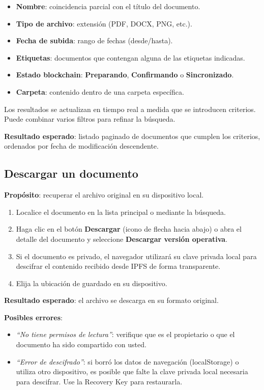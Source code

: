\documentclass[11pt, a4paper]{article}
\begin{document}
\begin{itemize}
    \item \textbf{Nombre}: coincidencia parcial con el t\'{i}tulo del documento.
    \item \textbf{Tipo de archivo}: extensi\'{o}n (PDF, DOCX, PNG, etc.).
    \item \textbf{Fecha de subida}: rango de fechas (desde/hasta).
    \item \textbf{Etiquetas}: documentos que contengan alguna de las etiquetas indicadas.
    \item \textbf{Estado blockchain}: \textbf{Preparando}, \textbf{Confirmando} o \textbf{Sincronizado}.
    \item \textbf{Carpeta}: contenido dentro de una carpeta espec\'{i}fica.
\end{itemize}

Los resultados se actualizan en tiempo real a medida que se introducen criterios. Puede combinar varios filtros para refinar la b\'{u}squeda.

\textbf{Resultado esperado}: listado paginado de documentos que cumplen los criterios, ordenados por fecha de modificaci\'{o}n descendente.

\subsection{Descargar un documento}

\textbf{Prop\'{o}sito}: recuperar el archivo original en su dispositivo local.

\begin{enumerate}
    \item Localice el documento en la lista principal o mediante la b\'{u}squeda.
    \item Haga clic en el bot\'{o}n \textbf{Descargar} (icono de flecha hacia abajo) o abra el detalle del documento y seleccione \textbf{Descargar versi\'{o}n operativa}.
    \item Si el documento es privado, el navegador utilizar\'{a} su clave privada local para descifrar el contenido recibido desde IPFS de forma transparente.
    \item Elija la ubicaci\'{o}n de guardado en su dispositivo.
\end{enumerate}

\textbf{Resultado esperado}: el archivo se descarga en su formato original.

\textbf{Posibles errores}:
\begin{itemize}
    \item \textit{``No tiene permisos de lectura''}: verifique que es el propietario o que el documento ha sido compartido con usted.
    \item \textit{``Error de descifrado''}: si borr\'{o} los datos de navegaci\'{o}n (localStorage) o utiliza otro dispositivo, es posible que falte la clave privada local necesaria para descifrar. Use la Recovery Key para restaurarla.
\end{itemize}
\end{document}
